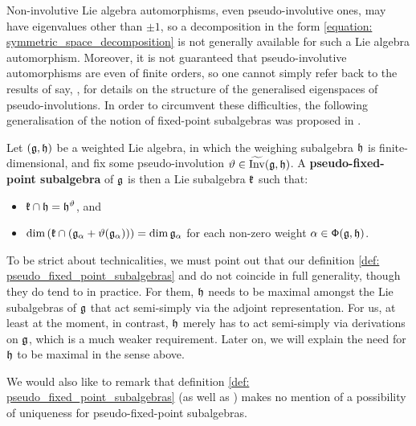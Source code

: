         Non-involutive Lie algebra automorphisms, even pseudo-involutive ones, may have eigenvalues other than $\pm 1$, so a decomposition in the form \eqref{equation: symmetric_space_decomposition} is not generally available for such a Lie algebra automorphism. Moreover, it is not guaranteed that pseudo-involutive automorphisms are even of finite orders, so one cannot simply refer back to the results of say, \cite[Chapter 8]{kac_infinite_dimensional_lie_algebras}, for details on the structure of the generalised eigenspaces of pseudo-involutions. In order to circumvent these difficulties, the following generalisation of the notion of fixed-point subalgebras was proposed in \cite[Definition 1.2]{regelskis_vlaar_kac_moody_pseudo_symmetric_pairs}. 
        \begin{definition} \label{def: pseudo_fixed_point_subalgebras}
            Let $(\mathfrak{g}, \mathfrak{h})$ be a weighted Lie algebra, in which the weighing subalgebra $\mathfrak{h}$ is finite-dimensional, and fix some pseudo-involution $\vartheta \in \widetilde{\operatorname{Inv}}(\mathfrak{g}, \mathfrak{h})$. A \textbf{pseudo-fixed-point subalgebra} of $\mathfrak{g}$ is then a Lie subalgebra $\mathfrak{k}$ such that:
            \begin{itemize}
                \item $\mathfrak{k} \cap \mathfrak{h} = \mathfrak{h}^{\vartheta}$, and
                \item $\dim\left( \mathfrak{k} \cap ( \mathfrak{g}_{\alpha} + \vartheta(\mathfrak{g}_{\alpha}) ) \right) = \dim \mathfrak{g}_{\alpha}$ for each non-zero weight $\alpha \in \mathsf{\Phi}(\mathfrak{g}, \mathfrak{h})$.
            \end{itemize}
        \end{definition}
        \begin{remark}
            To be strict about technicalities, we must point out that our definition \eqref{def: pseudo_fixed_point_subalgebras} and \cite[Definition 1.2]{regelskis_vlaar_kac_moody_pseudo_symmetric_pairs} do not coincide in full generality, though they do tend to in practice. For them, $\mathfrak{h}$ needs to be maximal amongst the Lie subalgebras of $\mathfrak{g}$ that act semi-simply via the adjoint representation. For us, at least at the moment, in contrast, $\mathfrak{h}$ merely has to act semi-simply via derivations on $\mathfrak{g}$, which is a much weaker requirement. Later on, we will explain the need for $\mathfrak{h}$ to be maximal in the sense above.
            
            We would also like to remark that definition \ref{def: pseudo_fixed_point_subalgebras} (as well as \cite[Definition 1.2]{regelskis_vlaar_kac_moody_pseudo_symmetric_pairs}) makes no mention of a possibility of uniqueness for pseudo-fixed-point subalgebras.
        \end{remark}

